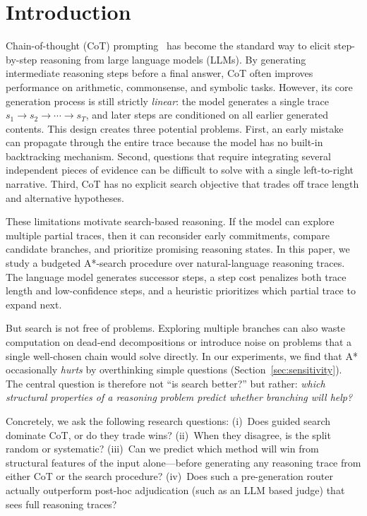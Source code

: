 \documentclass[10pt]{article}
\begin{document}
\section{Introduction}
\label{sec:intro}

Chain-of-thought (CoT) prompting~\cite{wei2022chain} has become the standard way to elicit step-by-step reasoning from large language models (LLMs). By generating intermediate reasoning steps before a final answer, CoT often improves performance on arithmetic, commonsense, and symbolic tasks. However, its core generation process is still strictly \emph{linear}: the model generates a single trace $s_1 \rightarrow s_2 \rightarrow \cdots \rightarrow s_T$, and later steps are conditioned on all earlier generated contents. This design creates three potential problems. First, an early mistake can propagate through the entire trace because the model has no built-in backtracking mechanism. Second, questions that require integrating several independent pieces of evidence can be difficult to solve with a single left-to-right narrative. Third, CoT has no explicit search objective that trades off trace length and alternative hypotheses.

These limitations motivate search-based reasoning. If the model can explore multiple partial traces, then it can reconsider early commitments, compare candidate branches, and prioritize promising reasoning states. In this paper, we study a budgeted A*-search procedure over natural-language reasoning traces. The language model generates successor steps, a step cost penalizes both trace length and low-confidence steps, and a heuristic prioritizes which partial trace to expand next.

But search is not free of problems. Exploring multiple branches can also waste computation on dead-end decompositions or introduce noise on problems that a single well-chosen chain would solve directly. In our experiments, we find that A* occasionally \emph{hurts} by overthinking simple questions (Section~\ref{sec:sensitivity}). The central question is therefore not ``is search better?'' but rather: \emph{which structural properties of a reasoning problem predict whether branching will help?}

Concretely, we ask the following research questions: (i)~Does guided search dominate CoT, or do they trade wins? (ii)~When they disagree, is the split random or systematic? (iii)~Can we predict which method will win from structural features of the input alone---before generating any reasoning trace from either CoT or the search procedure? (iv)~Does such a pre-generation router actually outperform post-hoc adjudication (such as an LLM based judge) that sees full reasoning traces?
\end{document}
